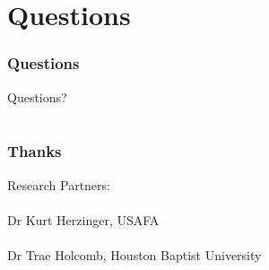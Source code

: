\documentclass{beamer}
\begin{document}
\section{Questions}

\begin{frame}
\begin{center}
\frametitle{Questions}

\Huge{\centerline{Questions?}}

\end{center}
\end{frame}

\section{}

\begin{frame}
\begin{center}
\frametitle{Thanks}

Research Partners:\\

~\\

Dr Kurt Herzinger, USAFA\\

~\\

Dr Trae Holcomb, Houston Baptist University

\end{center}
\end{frame}

\begin{frame}[noframenumbering]
\titlepage %
\end{frame}

\end{document}
